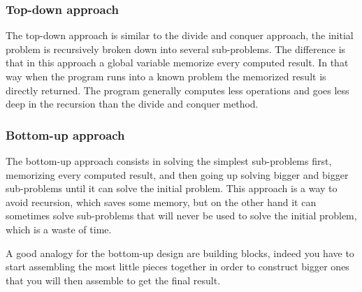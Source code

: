 \subsubsection{Top-down approach}

The top-down approach is similar to the divide and conquer approach, the initial problem is recursively broken down into several sub-problems.
The difference is that in this approach a global variable memorize every computed result. 
In that way when the program runs into a known problem the memorized result is directly returned.
The program generally computes less operations and goes less deep in the recursion than the divide and conquer method.

\subsubsection{Bottom-up approach}

The bottom-up approach consists in solving the simplest sub-problems first, memorizing every computed result, and then going up solving bigger and bigger sub-problems until it can solve the initial problem.
This approach is a way to avoid recursion, which saves some memory, but on the other hand it can sometimes solve sub-problems that will never be used to solve the initial problem, which is a waste of time.

A good analogy for the bottom-up design are building blocks, indeed you have to start assembling the most little pieces together in order to construct bigger ones that you will then assemble to get the final result.

